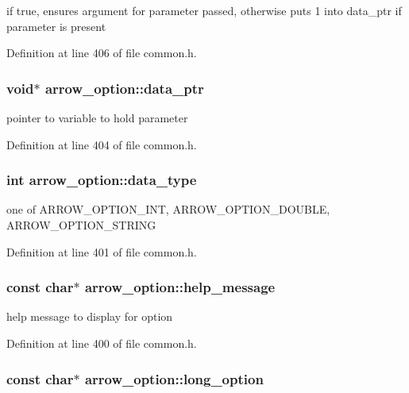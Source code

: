if true, ensures argument for parameter passed, otherwise puts 1 into data\_\-ptr if parameter is present 

Definition at line 406 of file common.h.\hypertarget{structarrow__option_0b4e8cc50fdb7d8fbb1e63db30cd172d}{
\subsubsection[{data\_\-ptr}]{\setlength{\rightskip}{0pt plus 5cm}void$\ast$ {\bf arrow\_\-option::data\_\-ptr}}}
\label{structarrow__option_0b4e8cc50fdb7d8fbb1e63db30cd172d}


pointer to variable to hold parameter 

Definition at line 404 of file common.h.\hypertarget{structarrow__option_c97df040be0b7c76e92556087be21ff8}{
\subsubsection[{data\_\-type}]{\setlength{\rightskip}{0pt plus 5cm}int {\bf arrow\_\-option::data\_\-type}}}
\label{structarrow__option_c97df040be0b7c76e92556087be21ff8}


one of ARROW\_\-OPTION\_\-INT, ARROW\_\-OPTION\_\-DOUBLE, ARROW\_\-OPTION\_\-STRING 

Definition at line 401 of file common.h.\hypertarget{structarrow__option_48bfe5bda71cd04d92067b203ffb92ce}{
\subsubsection[{help\_\-message}]{\setlength{\rightskip}{0pt plus 5cm}const char$\ast$ {\bf arrow\_\-option::help\_\-message}}}
\label{structarrow__option_48bfe5bda71cd04d92067b203ffb92ce}


help message to display for option 

Definition at line 400 of file common.h.\hypertarget{structarrow__option_3d8ddc7b0d627a15c7108e21a16cb51a}{
\subsubsection[{long\_\-option}]{\setlength{\rightskip}{0pt plus 5cm}const char$\ast$ {\bf arrow\_\-option::long\_\-option}}}
\label{structarrow__option_3d8ddc7b0d627a15c7108e21a16cb51a}


